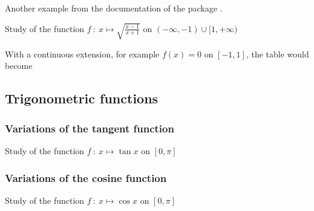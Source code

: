 Another example from the documentation of the package .

Study of the function $f~:~ x \longmapsto \sqrt{\frac{x-1}{x+1}}$ on $(-\infty, -1) \cup [1, +\infty)$

\begin{tkzexample}
\end{tkzexample}

With a continuous extension, for example $f(x)=0$ on $[-1, 1]$, the table would become

\begin{tkzexample}
\end{tkzexample}


\subsection{Trigonometric functions}
 \subsubsection{Variations of the tangent function}
 Study of the function $f~:~ x \longmapsto \tan{x}$ on $[0, \pi]$

 \begin{tkzexample}[vbox]
\end{tkzexample}

\subsubsection{Variations of the cosine function}
  Study of the function $f~:~ x \longmapsto \cos{x}$ on $[0, \pi]$

